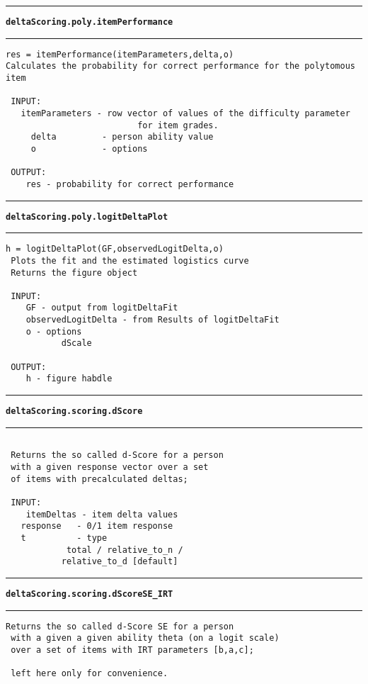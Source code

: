 \par\noindent\rule{\textwidth}{0.4pt}
{\bf\tt deltaScoring.poly.itemPerformance}
\par\noindent\rule{\textwidth}{0.4pt}
\begin{lstlisting}[style=Matlab-bw]
 res = itemPerformance(itemParameters,delta,o)
Calculates the probability for correct performance for the polytomous item

 INPUT:
   itemParameters - row vector of values of the difficulty parameter
                          for item grades.
	 delta 		   - person ability value
	 o             - options

 OUTPUT:
	res - probability for correct performance
\end{lstlisting}
\par\noindent\rule{\textwidth}{0.4pt}
{\bf\tt deltaScoring.poly.logitDeltaPlot}
\par\noindent\rule{\textwidth}{0.4pt}
\begin{lstlisting}[style=Matlab-bw]
 h = logitDeltaPlot(GF,observedLogitDelta,o)
 Plots the fit and the estimated logistics curve
 Returns the figure object

 INPUT:
    GF - output from logitDeltaFit
    observedLogitDelta - from Results of logitDeltaFit
    o - options
           dScale

 OUTPUT:
	h - figure habdle
\end{lstlisting}
\par\noindent\rule{\textwidth}{0.4pt}
{\bf\tt deltaScoring.scoring.dScore}
\par\noindent\rule{\textwidth}{0.4pt}
\begin{lstlisting}[style=Matlab-bw]

 Returns the so called d-Score for a person
 with a given response vector over a set
 of items with precalculated deltas;

 INPUT:
	itemDeltas - item delta values
   response   - 0/1 item response
   t          - type
			total / relative_to_n /
           relative_to_d [default]
\end{lstlisting}
\par\noindent\rule{\textwidth}{0.4pt}
{\bf\tt deltaScoring.scoring.dScoreSE\_IRT}
\par\noindent\rule{\textwidth}{0.4pt}
\begin{lstlisting}[style=Matlab-bw]
 Returns the so called d-Score SE for a person
 with a given a given ability theta (on a logit scale)
 over a set of items with IRT parameters [b,a,c];

 left here only for convenience.
\end{lstlisting}
